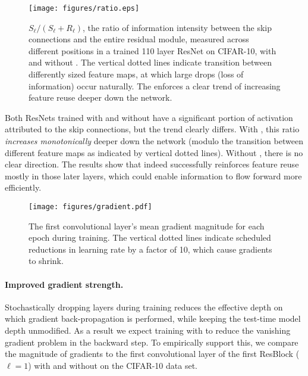 \documentclass[runningheads]{llncs}
\begin{document}
{\begin{figure}[t]
	\vspace{-2ex}
	\begin{center}
		\centerline{\texttt{[image: figures/ratio.eps]}}
\caption{$S_\ell/(S_\ell+R_\ell)$, the ratio of information intensity between the skip connections and the entire residual module, measured across different positions in a trained 110 layer ResNet on CIFAR-10, with and without \name{}. The vertical dotted lines indicate transition between differently sized feature maps, at which large drops (loss of information) occur naturally. The \name{} enforces a clear trend of increasing feature reuse deeper down the network.}
		\label{figure.std_ratio}
	\end{center}
	\vspace{-4ex}
\end{figure}

Both ResNets trained with and without \name{} have a significant portion of activation attributed to the skip connections, but the trend clearly differs.
With \name{}, this ratio \emph{increases monotonically} deeper down the network (modulo the transition between different feature maps as indicated by vertical dotted lines). Without \name{}, there is no clear direction. The results show that \name{} indeed successfully reinforces feature reuse mostly in those later layers, which could enable information to flow forward more efficiently.
}

\begin{figure}[t]
	\vspace{-2ex}
	\begin{center}
		\centerline{\texttt{[image: figures/gradient.pdf]}}
		\vspace{-2ex}
		\caption{The first convolutional layer's mean gradient magnitude for each epoch during training. The vertical dotted lines indicate scheduled reductions in learning rate by a factor of 10, which cause gradients to shrink.}
		\label{figure.gradient}
	\end{center}
	\vspace{-8ex}
\end{figure}

\paragraph{\textbf{Improved gradient strength.}}
Stochastically dropping layers during training reduces the effective depth on which gradient back-propagation is performed, while keeping the test-time model depth unmodified. As a result we expect training with \name{} to reduce the vanishing gradient problem in the backward step.
To empirically support this, we compare the magnitude of gradients to the first convolutional layer of the first ResBlock ($\ell\!=\!1$) with and without \name{} on the  CIFAR-10 data set.
\end{document}
